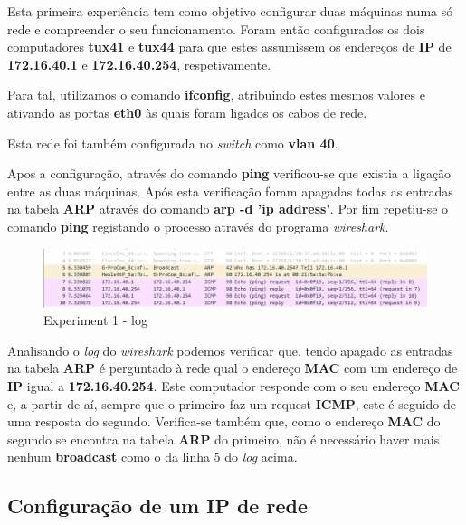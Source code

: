 \documentclass[a4paper]{article}
\begin{document}
	Esta primeira experiência tem como objetivo configurar duas máquinas numa só rede e compreender o seu funcionamento. Foram então configurados os dois computadores \textbf{tux41} e \textbf{tux44} para que estes assumissem os endereços de \textbf{IP} de \textbf{172.16.40.1} e \textbf{172.16.40.254}, respetivamente.

Para tal, utilizamos o comando \textbf{ifconfig}, atribuindo estes mesmos valores e ativando as portas \textbf{eth0} às quais foram ligados os cabos de rede.

Esta rede foi também configurada no \textit{switch} como \textbf{vlan 40}.

Apos a configuração, através do comando \textbf{ping} verificou-se que existia a ligação entre as duas máquinas. Após esta verificação foram apagadas todas as entradas na tabela \textbf{ARP} através do comando \textbf{arp -d 'ip address'}. Por fim repetiu-se o comando \textbf{ping} registando o processo através do programa \textit{wireshark}.

	\begin{figure}[H]
	\begin{center}
  	\includegraphics[width=\linewidth]{exp1_wireshark.png}
  	\caption{Experiment 1 - log}
  	\label{fig:Experiment 1 - log}
	\end{center}
	\end{figure}

	Analisando o \textit{log} do \textit{wireshark} podemos verificar que, tendo apagado as entradas na tabela \textbf{ARP} é perguntado à rede qual o endereço \textbf{MAC} com um endereço de \textbf{IP} igual a \textbf{172.16.40.254}. Este computador responde com o seu endereço \textbf{MAC} e, a partir de aí, sempre que o primeiro faz um request \textbf{ICMP}, este é seguido de uma resposta do segundo. Verifica-se também que, como o endereço \textbf{MAC} do segundo se encontra na tabela \textbf{ARP} do primeiro, não é necessário haver mais nenhum \textbf{broadcast} como o da linha 5 do \textit{log} acima.

	\subsection{Configuração de um IP de rede}

	\clearpage
\end{document}
